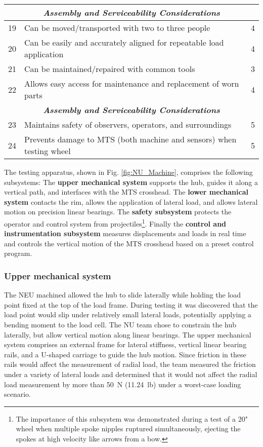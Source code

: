 \documentclass[\rootdir/thesis.tex]{subfiles}
\begin{document}
\begin{table}
\begin{tabularx}{\linewidth}{r|Xc}
\midrule
\multicolumn{3}{c}{\emph{\textbf{Assembly and Serviceability Considerations}}}\\
\midrule
19& Can be moved/transported with two to three people& 4\\
20& Can be easily and accurately aligned for repeatable load application& 4\\
21& Can be maintained/repaired with common tools& 3\\
22& Allows easy access for maintenance and replacement of worn parts& 4\\
\midrule
\multicolumn{3}{c}{\emph{\textbf{Assembly and Serviceability Considerations}}}\\
\midrule
23& Maintains safety of observers, operators, and surroundings& 5\\
24& Prevents damage to MTS (both machine and sensors) when testing wheel& 5\\
\bottomrule
\end{tabularx}
\end{table}

The testing apparatus, shown in Fig. \ref{fig:NU_Machine}, comprises the following subsystems: The \textbf{upper mechanical system} supports the hub, guides it along a vertical path, and interfaces with the MTS crosshead. The \textbf{lower mechanical system} contacts the rim, allows the application of lateral load, and allows lateral motion on precision linear bearings. The \textbf{safety subsystem} protects the operator and control system from projectiles\footnote{The importance of this subsystem was demonstrated during a test of a 20" wheel when multiple spoke nipples ruptured simultaneously, ejecting the spokes at high velocity like arrows from a bow.}. Finally the \textbf{control and instrumentation subsystem} measures displacements and loads in real time and controls the vertical motion of the MTS crosshead based on a preset control program.

\subsubsection*{Upper mechanical system}
The NEU machined allowed the hub to slide laterally while holding the load point fixed at the top of the load frame. During testing it was discovered that the load point would slip under relatively small lateral loads, potentially applying a bending moment to the load cell. The NU team chose to constrain the hub laterally, but allow vertical motion along linear bearings. The upper mechanical system comprises an external frame for lateral stiffness, vertical linear bearing rails, and a U-shaped carriage to guide the hub motion. Since friction in these rails would affect the measurement of radial load, the team measured the friction under a variety of lateral loads and determined that it would not affect the radial load measurement by more than \SI{50}{\newton} (\SI{11.24}{lb}) under a worst-case loading scenario.
\end{document}
